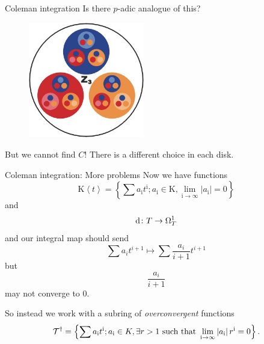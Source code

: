 \begin{frame}{Coleman integration}
    Is there $p$-adic analogue of this?


\begin{figure}
{
    \includegraphics[width=0.45\textwidth]{padic.jpg}
}
\caption*{}
\end{figure}




{
    But we cannot find $C$! There is a different choice in each disk.
}

\end{frame}

\begin{frame}{Coleman integration: More problems}
    Now we have functions
    \[\mathrm{K}\left\langle t\right\rangle=\left\{\sum a_{\mathrm{i}} t^{\mathrm{i}} ; a_{\mathrm{i}} \in \mathrm{K}, \lim _{\mathrm{i} \rightarrow \infty}\left|a_{\mathrm{i}}\right|=0\right\}\]
    and
    \[\mathop{}\!\mathrm{d} \colon T \to \Omega ^1_{T}\]
    and our integral map should send
    \[ \sum a_{i} t^{i+1}\mapsto\sum \frac{a_{i}}{i+1} t^{i+1} \]
    but\pause
    \[\frac{a_i}{i+1}\]
    may not converge to 0.  \pause

    So instead we work with a subring of \emph{overconvergent} functions
    \[\mathcal{T}^{\dagger}=\left\{\sum a_{\mathrm{i}} t^{\mathrm{i}} ; a_{\mathrm{i}} \in K, \exists r>1 \text { such that } \lim _{\mathrm{i} \rightarrow \infty}\left|a_{\mathrm{i}}\right| r^{\mathrm{i}}=0\right\}\text.\]

\end{frame}


